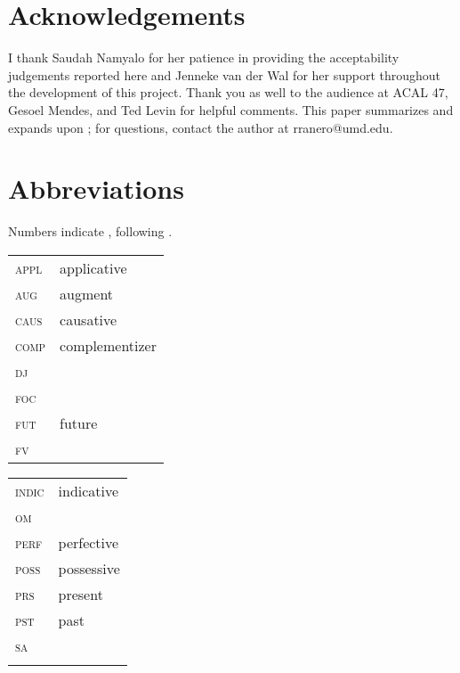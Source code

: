 \documentclass[output=paper
,newtxmath
,modfonts
,nonflat]{langsci/langscibook}
\begin{document}
\section*{Acknowledgements}

I thank Saudah Namyalo for her patience in providing the acceptability judgements reported here and Jenneke van der Wal for her support throughout the development of this project. Thank you as well to the audience at ACAL 47, Gesoel Mendes, and Ted Levin for helpful comments. This paper summarizes and expands upon \citet{ranero2015}; for questions, contact the author at rranero@umd.edu.

\section*{Abbreviations}

Numbers indicate  , following \citet{Hyman1990}. 

\noindent
\begin{tabularx}{.45\textwidth}{lQ}
\textsc{appl} & applicative\\
\textsc{aug} & augment \\
\textsc{caus} & causative \\
\textsc{comp} & complementizer \\
\textsc{dj} & \\
\textsc{foc} & \\
\textsc{fut} & future\\
\textsc{fv} & \\
\end{tabularx}
\begin{tabularx}{.45\textwidth}{lQ}
\textsc{indic} & indicative\\
\textsc{om} & \\
\textsc{perf} & perfective\\
\textsc{poss} & possessive\\
\textsc{prs} & present\\
\textsc{pst} & past\\
\textsc{sa} &  \\
\\
\end{tabularx}
\end{document}
